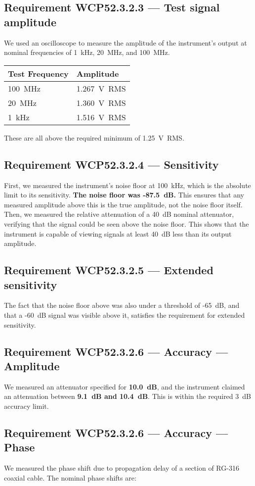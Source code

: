 \subsection*{Requirement WCP52.3.2.3 --- Test signal amplitude}
We used an oscilloscope to measure the amplitude of the instrument's output
at nominal frequencies of 1~kHz, 20~MHz, and 100~MHz.

\begin{tabular}{|l|l|}
\hline
Test Frequency & Amplitude \\ \hline \hline
100~MHz & 1.267~V~RMS \\ \hline
20~MHz & 1.360~V~RMS \\ \hline
1~kHz & 1.516~V~RMS \\ \hline
\end{tabular}

These are all above the required minimum of 1.25~V~RMS.

\subsection*{Requirement WCP52.3.2.4 --- Sensitivity}
First, we measured the instrument's noise floor at 100~kHz, which is the
absolute limit to its sensitivity. \textbf{The noise floor was -87.5~dB.} This
ensures that any measured amplitude above this is the true amplitude, not
the noise floor itself. Then, we measured the relative attenuation of a
40~dB nominal attenuator, verifying that the signal could be seen above the
noise floor. This shows that the instrument is capable of viewing signals
at least 40~dB less than its output amplitude.

\subsection*{Requirement WCP52.3.2.5 --- Extended sensitivity}
The fact that the noise floor above was also under a threshold of -65~dB,
and that a -60~dB signal was visible above it,
satisfies the requirement for extended sensitivity.

\subsection*{Requirement WCP52.3.2.6 --- Accuracy --- Amplitude}
We measured an attenuator specified for \textbf{10.0~dB}, and the instrument
claimed an attenuation between \textbf{9.1~dB and 10.4~dB}. This is within the
required 3~dB accuracy limit.

\subsection*{Requirement WCP52.3.2.6 --- Accuracy --- Phase}
We measured the phase shift due to propagation delay of a section of RG-316 coaxial
cable. The nominal phase shifts are:

